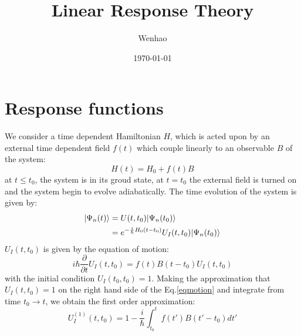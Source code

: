 \documentclass{article}
\begin{document}
\title{Linear Response Theory}
\author{Wenhao}
\date{\today}
\maketitle

\section{Response functions}
We consider a time dependent Hamiltonian $H$, which is acted upon by an external time dependent field
$f(t)$ which couple linearly to an observable $B$ of the system:
\begin{equation}
    H(t) = H_0 + f(t)B
\end{equation} 
at $t \le t_0$, the system is in its groud state, at $t = t_0$ the external field is turned on and 
the system begin to evolve adiabatically. 
The time evolution of the system is given by:
\begin{align}
    | \Psi_n(t) \rangle &= U(t,t_0) | \Psi_n(t_0) \rangle \notag \\
                     &= e^{-\frac{i}{\hbar}H_0(t-t_0)} U_I(t,t_0) | \Psi_n(t_0) \rangle \notag 
\end{align}
$U_I(t,t_0)$ is given by the equation of motion:
\begin{equation}
    i\hbar \frac{\partial}{\partial t} U_I(t,t_0) = f(t) B(t-t_0) U_I(t,t_0) \label{eqmotion}
\end{equation}
with the initial condition $U_I(t_0,t_0) = 1$. Making the approximation that $U_I(t,t_0) = 1$ on the 
right hand side of the Eq.\ref{eqmotion} and integrate from time $t_0 \to t$, we obtain the first order approximation:
\begin{equation}
    U_I^{(1)}(t,t_0) = 1 - \frac{i}{\hbar} \int_{t_0}^{t} f(t') B(t'-t_0) dt'
\end{equation}
\end{document}
